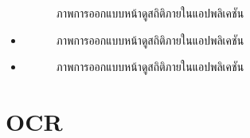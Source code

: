 \documentclass[12pt,oneside,openright,a4paper]{cpe-thai-project}
\begin{document}
\begin{itemize}
\begin{figure}[!ht]
    \caption{ภาพการออกแบบหน้าดูสถิติภายในแอปพลิเคชัน}\label{fig:system}
  \end{figure}
 \item   \begin{figure}[!ht]\centering
    \setlength{\fboxrule}{0.2mm} %
    \setlength{\fboxsep}{1cm}
    \caption{ภาพการออกแบบหน้าดูสถิติภายในแอปพลิเคชัน}\label{fig:system}
  \end{figure}
 \item   \begin{figure}[!ht]\centering
    \setlength{\fboxrule}{0.2mm} %
    \setlength{\fboxsep}{1cm}
    \caption{ภาพการออกแบบหน้าดูสถิติภายในแอปพลิเคชัน}\label{fig:system}                  
\end{figure}
\end{itemize}
\section{OCR}


\nocite{*}


\end{document}
